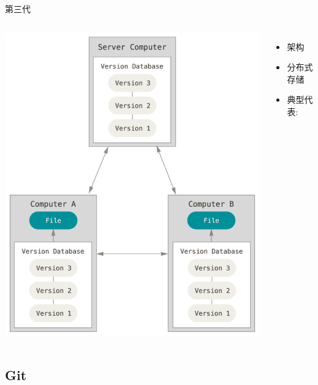 \begin{frame}{第三代}
    \begin{columns}[onlytextwidth]
        \centering
        \includegraphics[scale=0.24]{figures/distributed.png}\\
        \begin{itemize}
            \item {}架构
            \item 分布式存储
            \item 典型代表:
        \end{itemize}
    \end{columns}
\end{frame}

\subsection{Git}

